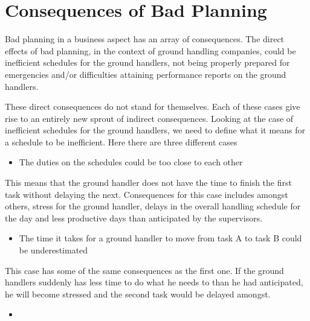 \section{Consequences of Bad Planning}
Bad planning in a business aspect has an array of consequences. The direct effects of bad planning, in the context of ground handling companies, could be inefficient schedules for the ground handlers, not being properly prepared for emergencies and/or difficulties attaining performance reports on the ground handlers.

These direct consequences do not stand for themselves. Each of these cases give rise to an entirely new sprout of indirect consequences.
Looking at the case of inefficient schedules for the ground handlers, we need to define what it means for a schedule to be inefficient. Here there are three different cases
\begin{itemize}
	\item The duties on the schedules could be too close to each other
\end{itemize}
This means that the ground handler does not have the time to finish the first task without delaying the next. Consequences for this case includes amongst others, stress for the ground handler, delays in the overall handling schedule for the day and less productive days than anticipated by the supervisors.
\begin{itemize}
	\item The time it takes for a ground handler to move from task A to task B could be underestimated
\end{itemize}
This case has some of the same consequences as the first one. If the ground handlers suddenly has less time to do what he needs to than he had anticipated, he will become stressed and the second task would be delayed amongst.
\begin{itemize}
	\item 
\end{itemize}